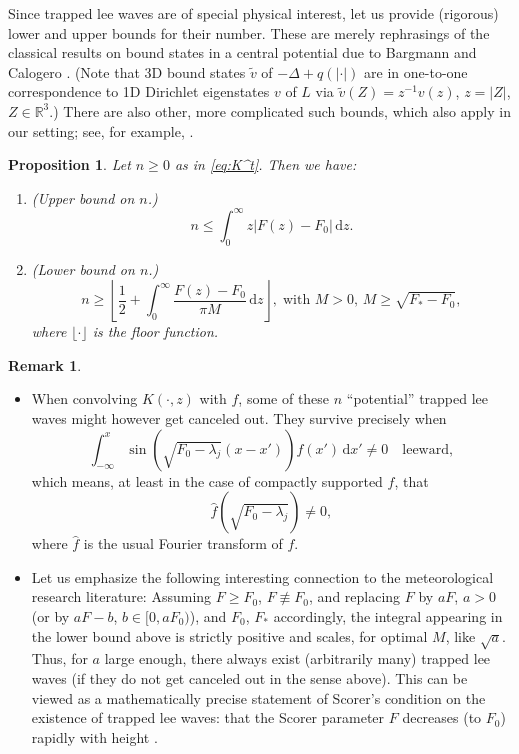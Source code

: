 \documentclass[11pt,twoside,reqno,centertags]{amsart}
\newtheorem{proposition}[theorem]{Proposition}
\theoremstyle{definition}
\newtheorem{remark}[theorem]{Remark}
\newcommand{\R}{\mathbb R}
\newcommand{\dd}{\mathrm d}
\begin{document}
Since trapped lee waves are of special physical interest, let us provide (rigorous) lower and upper bounds for their number. These are merely rephrasings of the classical results on bound states in a central potential due to Bargmann \cite{Bargmann52} and Calogero \cite{Calogero56}. (Note that 3D bound states $\tilde v$ of $-\Delta + q(|\cdot|)$ are in one-to-one correspondence to 1D Dirichlet eigenstates $v$ of $L$ via $\tilde v(Z) = z^{-1} v(z)$, $z=|Z|$, $Z\in\R^3$.) There are also other, more complicated such bounds, which also apply in our setting; see, for example, \cite[Thm. XIII.9]{ReedSimonIV}.
\begin{proposition}\label{prop:trapped}
	Let $n\ge0$ as in \eqref{eq:K^t}. Then we have:
	\begin{enumerate}[label=(\alph*)]
		\item (Upper bound on $n$.)
		\[n \le \int_0^\infty z|F(z)-F_0|\,\dd z.\]
		\item (Lower bound on $n$.)
		\[n \ge \left\lfloor \frac12 + \int_0^\infty \frac{F(z)-F_0}{\pi M}\,\dd z \right\rfloor,\; \text{with }M>0,\, M\ge\sqrt{F_*-F_0},\]
		where $\lfloor\cdot\rfloor$ is the floor function.
	\end{enumerate}
\end{proposition}
\begin{remark}
	\begin{itemize}
		\item When convolving $K(\cdot,z)$ with $f$, some of these $n$ \enquote{potential} trapped lee waves might however get canceled out. They survive precisely when
		\[\int_{-\infty}^x \sin(\sqrt{F_0-\lambda_j}(x-x')) f(x')\, \dd x' \ne 0 \quad \text{leeward},\]
		which means, at least in the case of compactly supported $f$, that
		\[\hat f(\sqrt{F_0-\lambda_j}) \ne 0,\]
		where $\hat f$ is the usual Fourier transform of $f$.
		\item Let us emphasize the following interesting connection to the meteorological research literature: Assuming $F\ge F_0$, $F\not\equiv F_0$, and replacing $F$ by $aF$, $a>0$ (or by $aF-b$, $b\in[0,aF_0)$), and $F_0$, $F_*$ accordingly, the integral appearing in the lower bound above is strictly positive and scales, for optimal $M$, like $\sqrt a$. Thus, for $a$ large enough, there always exist (arbitrarily many) trapped lee waves (if they do not get canceled out in the sense above). This can be viewed as a mathematically precise statement of Scorer's condition on the existence of trapped lee waves: that the Scorer parameter $F$ decreases (to $F_0$) rapidly with height \cite{Scorer49}.
	\end{itemize}
\end{remark}
\end{document}
